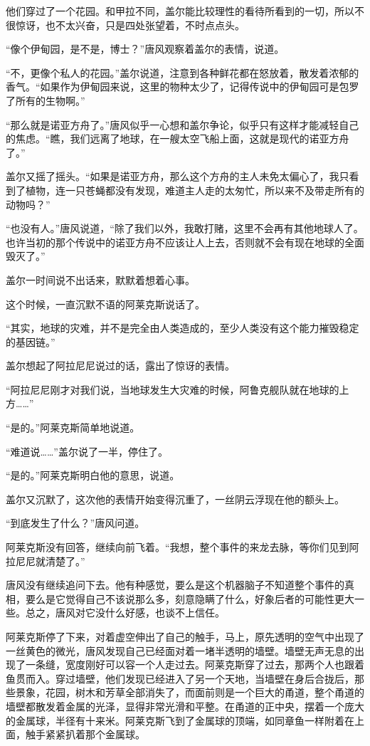 他们穿过了一个花园。和甲拉不同，盖尔能比较理性的看待所看到的一切，所以不很惊讶，也不太兴奋，只是四处张望着，不时点点头。

“像个伊甸园，是不是，博士？”唐风观察着盖尔的表情，说道。

“不，更像个私人的花园。”盖尔说道，注意到各种鲜花都在怒放着，散发着浓郁的香气。“如果作为伊甸园来说，这里的物种太少了，记得传说中的伊甸园可是包罗了所有的生物啊。”

“那么就是诺亚方舟了。”唐风似乎一心想和盖尔争论，似乎只有这样才能减轻自己的焦虑。“瞧，我们远离了地球，在一艘太空飞船上面，这就是现代的诺亚方舟了。”

盖尔又摇了摇头。“如果是诺亚方舟，那么这个方舟的主人未免太偏心了，我只看到了植物，连一只苍蝇都没有发现，难道主人走的太匆忙，所以来不及带走所有的动物吗？”

“也没有人。”唐风说道，“除了我们以外，我敢打赌，这里不会再有其他地球人了。也许当初的那个传说中的诺亚方舟不应该让人上去，否则就不会有现在地球的全面毁灭了。”

盖尔一时间说不出话来，默默着想着心事。

这个时候，一直沉默不语的阿莱克斯说话了。

“其实，地球的灾难，并不是完全由人类造成的，至少人类没有这个能力摧毁稳定的基因链。”

盖尔想起了阿拉尼尼说过的话，露出了惊讶的表情。

“阿拉尼尼刚才对我们说，当地球发生大灾难的时候，阿鲁克舰队就在地球的上方……”

“是的。”阿莱克斯简单地说道。

“难道说……”盖尔说了一半，停住了。

“是的。”阿莱克斯明白他的意思，说道。

盖尔又沉默了，这次他的表情开始变得沉重了，一丝阴云浮现在他的额头上。

“到底发生了什么？”唐风问道。

阿莱克斯没有回答，继续向前飞着。“我想，整个事件的来龙去脉，等你们见到阿拉尼尼就清楚了。”

唐风没有继续追问下去。他有种感觉，要么是这个机器脑子不知道整个事件的真相，要么是它觉得自己不该说那么多，刻意隐瞒了什么，好象后者的可能性更大一些。总之，唐风对它没什么好感，也谈不上信任。

阿莱克斯停了下来，对着虚空伸出了自己的触手，马上，原先透明的空气中出现了一丝黄色的微光，唐风发现自己已经面对着一堵半透明的墙壁。墙壁无声无息的出现了一条缝，宽度刚好可以容一个人走过去。阿莱克斯穿了过去，那两个人也跟着鱼贯而入。穿过墙壁，他们发现已经进入了另一个天地，当墙壁在身后合拢后，那些景象，花园，树木和芳草全部消失了，而面前则是一个巨大的甬道，整个甬道的墙壁都散发着金属的光泽，显得非常光滑和平整。在甬道的正中央，摆着一个庞大的金属球，半径有十来米。阿莱克斯飞到了金属球的顶端，如同章鱼一样附着在上面，触手紧紧扒着那个金属球。

